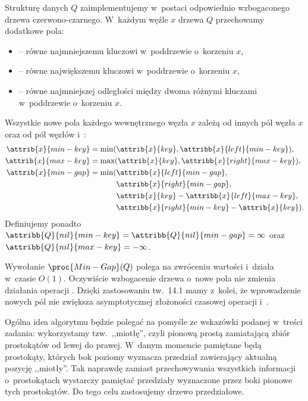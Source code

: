 \exercise %
Strukturę danych $Q$ zaimplementujemy w~postaci odpowiednio wzbogaconego drzewa czerwono-czarnego.
W~każdym węźle $x$ drzewa $Q$ przechowamy dodatkowe pola:
\begin{itemize}
	\item {} -- równe najmniejszemu kluczowi w~poddrzewie o~korzeniu $x$,
	\item {} -- równe największemu kluczowi w~poddrzewie o~korzeniu $x$,
	\item {} -- równe najmniejszej odległości między dwoma różnymi kluczami w~poddrzewie o~korzeniu $x$.
\end{itemize}
Wszystkie nowe pola każdego wewnętrznego węzła $x$ zależą od innych pól węzła $x$ oraz od pól węzłów  i~:
\begin{align*}
	\attrib{x}{min-key} &= \min(\attrib{x}{key},\attribb{x}{left}{min-key}), \\
	\attrib{x}{max-key} &= \max(\attrib{x}{key},\attribb{x}{right}{max-key}), \\
	\attrib{x}{min-gap} &= \min(\attribb{x}{left}{min-gap}, \\
		&\phantom{{}=\min(}\attribb{x}{right}{min-gap}, \\
		&\phantom{{}=\min(}\attrib{x}{key}-\attribb{x}{left}{max-key}, \\
		&\phantom{{}=\min(}\attribb{x}{right}{min-key}-\attrib{x}{key}).
\end{align*}
Definiujemy ponadto $\attribb{Q}{nil}{min-key}=\attribb{Q}{nil}{min-gap}=\infty$ oraz $\attribb{Q}{nil}{max-key}=-\infty$.

Wywołanie $\proc{Min-Gap}(Q)$ polega na zwróceniu wartości  i~działa w~czasie $O(1)$.
Oczywiście wzbogacenie drzewa o~nowe pola nie zmienia działania operacji .
Dzięki zastosowaniu tw.\ 14.1 mamy z~kolei, że wprowadzenie nowych pól nie zwiększa asymptotycznej złożoności czasowej operacji  i~.

\exercise %
Ogólna idea algorytmu będzie polegać na pomyśle ze wskazówki podanej w~treści zadania: wykorzystamy tzw.\ ,,miotłę'', czyli pionową prostą zamiatającą zbiór prostokątów od lewej do prawej.
W~danym momencie pamiętane będą prostokąty, których bok poziomy wyznacza przedział zawierający aktualną pozycję ,,miotły''.
Tak naprawdę zamiast przechowywania wszystkich informacji o~prostokątach wystarczy pamiętać przedziały wyznaczone przez boki pionowe tych prostokątów.
Do tego celu zastosujemy drzewo przedziałowe.


